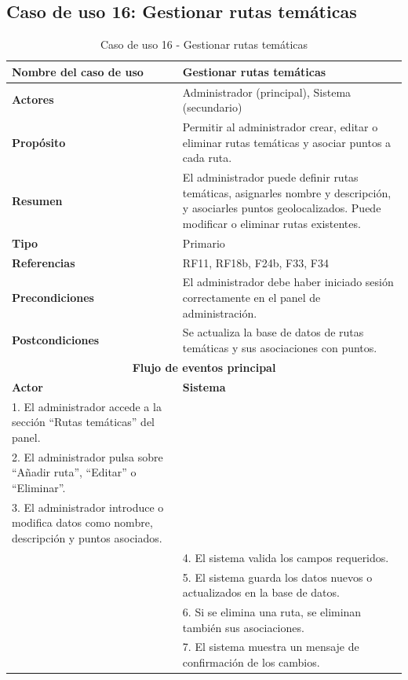 \subsection{Caso de uso 16: Gestionar rutas temáticas}

\begin{table}[H]
\centering
\caption{Caso de uso 16 - Gestionar rutas temáticas}
\begin{tabular}{|p{4.5cm}|p{10.5cm}|}
\hline
\textbf{Nombre del caso de uso} & Gestionar rutas temáticas \\
\hline
\textbf{Actores} & Administrador (principal), Sistema (secundario) \\
\hline
\textbf{Propósito} & Permitir al administrador crear, editar o eliminar rutas temáticas y asociar puntos a cada ruta. \\
\hline
\textbf{Resumen} & El administrador puede definir rutas temáticas, asignarles nombre y descripción, y asociarles puntos geolocalizados. Puede modificar o eliminar rutas existentes. \\
\hline
\textbf{Tipo} & Primario \\
\hline
\textbf{Referencias} & RF11, RF18b, F24b, F33, F34 \\
\hline
\textbf{Precondiciones} & El administrador debe haber iniciado sesión correctamente en el panel de administración. \\
\hline
\textbf{Postcondiciones} & Se actualiza la base de datos de rutas temáticas y sus asociaciones con puntos. \\
\hline
\multicolumn{2}{|c|}{\textbf{Flujo de eventos principal}} \\
\hline
\textbf{Actor} & \textbf{Sistema} \\
\hline
1. El administrador accede a la sección “Rutas temáticas” del panel. & \\
\hline
2. El administrador pulsa sobre “Añadir ruta”, “Editar” o “Eliminar”. & \\
\hline
3. El administrador introduce o modifica datos como nombre, descripción y puntos asociados. & \\
\hline
& 4. El sistema valida los campos requeridos. \\
\hline
& 5. El sistema guarda los datos nuevos o actualizados en la base de datos. \\
\hline
& 6. Si se elimina una ruta, se eliminan también sus asociaciones. \\
\hline
& 7. El sistema muestra un mensaje de confirmación de los cambios. \\
\hline
\end{tabular}
\end{table}

